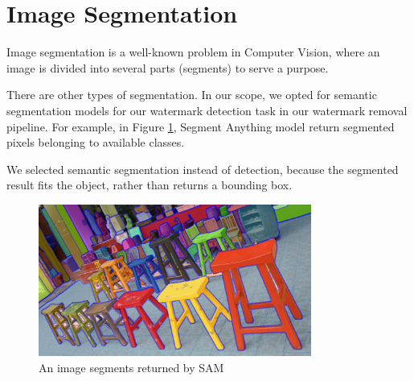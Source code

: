 \section{Image Segmentation}

Image segmentation is a well-known problem in Computer Vision, where an image is divided into several parts (segments) to serve a purpose.

There are other types of segmentation. In our scope, we opted for semantic segmentation models for our watermark detection task in our watermark removal pipeline. For example, in Figure \ref{figure:sam-all}, Segment Anything model \cite{kirillov2023segment} return segmented pixels belonging to available classes.

We selected semantic segmentation instead of detection, because the segmented result fits the object, rather than returns a bounding box.

\begin{figure}[ht]
    \centering
    \includegraphics[width=0.8\textwidth]{img/sam-segmented-all.png}
    \caption[An image segments returned by SAM]{An image segments returned by SAM \cite{kirillov2023segment}}
    \label{figure:sam-all}
\end{figure}









